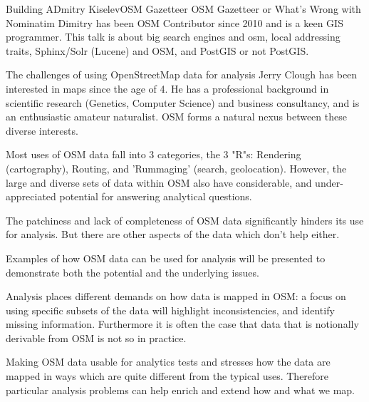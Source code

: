%
{Building A}{Dmitry Kiselev}{OSM Gazetteer}%
{OSM Gazetteer or What's Wrong with Nominatim}%
{Dimitry has been OSM Contributor since 2010 and is a keen GIS programmer. }%
{This talk is about big search engines and osm, local addressing traits,
Sphinx/Solr (Lucene) and OSM, and PostGIS or not PostGIS. }

%
{The challenges of using OpenStreetMap data for analysis}%
{Jerry Clough has been interested in maps since the age of 4. He has a professional background in scientific research (Genetics, Computer Science) and business consultancy, and is an enthusiastic amateur naturalist. OSM forms a natural nexus between these diverse interests. }%
{Most uses of OSM data fall into 3 categories, the 3 "R"s: Rendering (cartography), Routing, and 'Rummaging' (search, geolocation). However, the large and diverse sets of data within OSM also have considerable, and under-appreciated potential for answering analytical questions.

The patchiness and lack of completeness of OSM data significantly hinders its use for analysis.  But there are other aspects of the data which don't help either.

Examples of how OSM data can be used for analysis will be presented to demonstrate both the potential and the underlying issues.

Analysis places different demands on how data is mapped in OSM: a focus on using specific subsets of the data will highlight inconsistencies, and identify missing information. Furthermore it is often the case that data that is notionally derivable from OSM is not so in practice. 

Making OSM data usable for analytics tests and stresses how the data are mapped in ways which are quite different from the typical uses. Therefore particular analysis problems can help enrich and extend how and what we map.}
